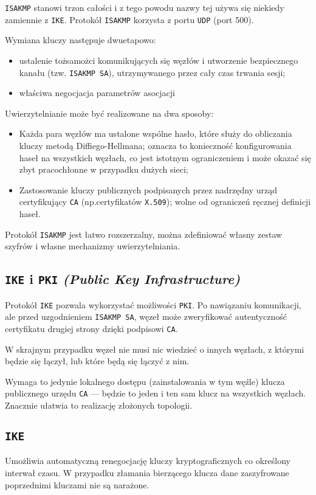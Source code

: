 \documentclass[a4paper]{article}
\begin{document}
{\tt ISAKMP} stanowi trzon całości i z tego powodu nazwy tej używa się niekiedy zamiennie z {\tt IKE}.
Protokół {\tt ISAKMP} korzysta z portu {\tt UDP} (port 500).

Wymiana kluczy następuje dwuetapowo:

\begin{itemize}
  \item ustalenie tożsamożci komunikujących się węzłów i utworzenie bezpiecznego kanału (tzw. {\tt ISAKMP SA}), utrzymywanego przez cały czas trwania sesji;
  \item właściwa negocjacja parametrów asocjacji
\end{itemize}

Uwierzytelnianie może być realizowane na dwa sposoby:
\begin{itemize}
  \item Każda para węzłów ma ustalone wspólne hasło, które służy do obliczania kluczy metodą Diffiego-Hellmana; oznacza to konieczność konfigurowania haseł na wszystkich węzłach, co jest istotnym ograniczeniem i może okazać się zbyt pracochłonne w przypadku dużych sieci;
  \item Zastosowanie kluczy publicznych podpisanych przez nadrzędny urząd certyfikujący {\tt CA} (np.\@ certyfikatów {\tt X.509}); wolne od ograniczeń ręcznej definicji haseł.
\end{itemize}

Protokół {\tt ISAKMP} jest łatwo rozszerzalny, można zdefiniować własny zestaw szyfrów i własne mechanizmy uwierzytelniania.

\subsection{{\tt IKE} i {\tt PKI} \emph{(Public Key Infrastructure)}}

Protokół {\tt IKE} pozwala wykorzystać możliwości {\tt PKI}. Po nawiązaniu komunikacji, ale przed uzgodnieniem {\tt ISAKMP SA}, węzeł może zweryfikować autentyczność certyfikatu drugiej strony dzięki podpisowi {\tt CA}.

W skrajnym przypadku węzeł nie musi nic wiedzieć o innych węzłach, z którymi będzie się łączył, lub które będą się łączyć z nim.

Wymaga to jedynie lokalnego dostępu (zainstalowania w tym węźle) klucza publicznego urzędu {\tt CA} --- będzie to jeden i ten sam klucz na wszystkich węzłach. Znacznie ułatwia to realizację złożonych topologii.
\pagebreak
\subsection{\tt IKE}
Umożliwia automatyczną renegocjację kluczy kryptograficznych co określony interwał czasu.
W przypadku złamania bierzącego klucza dane zaszyfrowane poprzednimi kluczami nie są narażone.
\end{document}
